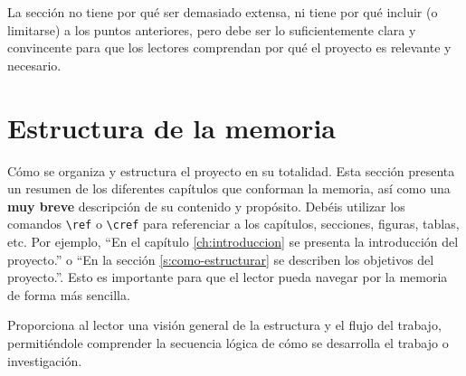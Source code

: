 La sección no tiene por qué ser demasiado extensa, ni tiene por qué incluir (o limitarse) a los puntos anteriores, pero debe ser lo suficientemente clara y convincente para que los lectores comprendan por qué el proyecto es relevante y necesario.

\section{Estructura de la memoria}

Cómo se organiza y estructura el proyecto en su totalidad. Esta sección presenta un resumen de los diferentes capítulos que conforman la memoria, así como una \textbf{muy breve} descripción de su contenido y propósito.
Debéis utilizar los comandos \texttt{\textbackslash ref} o \texttt{\textbackslash cref} para referenciar a los capítulos, secciones, figuras, tablas, etc.
Por ejemplo, \enquote{En el capítulo \ref{ch:introduccion} se presenta la introducción del proyecto.} o \enquote{En la sección \ref{s:como-estructurar} se describen los objetivos del proyecto.}. Esto es importante para que el lector pueda navegar por la memoria de forma más sencilla.

Proporciona al lector una visión general de la estructura y el flujo del trabajo, permitiéndole comprender la secuencia lógica de cómo se desarrolla el trabajo o investigación.